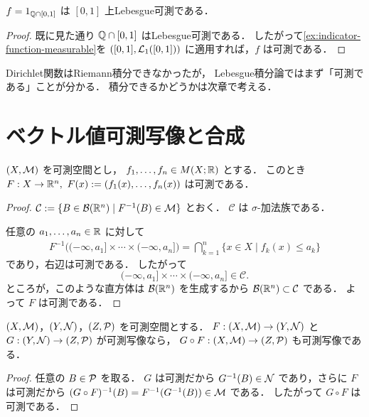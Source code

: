 \begin{example}[Dirichlet関数]
$f=1_{\mathbb Q\cap[0,1]}$
は $[0,1]$ 上Lebesgue可測である．
\end{example}
\begin{proof}
既に見た通り 
$\mathbb Q\cap[0,1]$ はLebesgue可測である．
したがって\cref{ex:indicator-function-measurable}を
$([0,1],\mathcal L_1([0,1]))$ に適用すれば，$f$ は可測である．
\end{proof}

\begin{remark}
Dirichlet関数はRiemann積分できなかったが，
Lebesgue積分論ではまず「可測である」ことが分かる．
積分できるかどうかは次章で考える．
\end{remark}

\section{ベクトル値可測写像と合成}

\begin{proposition}[有限個の可測関数をまとめた写像]\label{prop:measurable-vector-map}
$(X,\mathcal M)$ を可測空間とし，
$f_1,\dots,f_n\in M(X;\mathbb R)$ とする．
このとき $F:X\to\RR^n,\ F(x):=(f_1(x),\dots,f_n(x))$ は可測である．
\end{proposition}
\begin{proof}
$\mathcal C:=\{B\in\mathcal B(\mathbb R^n)\mid F^{-1}(B)\in \mathcal M\}$
とおく．
$\mathcal C$ は $\sigma$-加法族である．

任意の $a_1,\dots,a_n\in\mathbb R$ に対して
\begin{align*}
F^{-1}\bigl((-\infty,a_1]\times\cdots\times(-\infty,a_n]\bigr)
=
\bigcap_{k=1}^n \{x\in X\mid f_k(x)\le a_k\}
\end{align*}
であり，右辺は可測である．
したがって
\[
(-\infty,a_1]\times\cdots\times(-\infty,a_n]\in\mathcal C.
\]
ところが，このような直方体は $\mathcal B(\mathbb R^n)$ を生成するから
$\mathcal B(\mathbb R^n)\subset \mathcal C$
である．
よって $F$ は可測である．
\end{proof}

\begin{theorem}[可測写像の合成]\label{thm:measurable-map-composition}
$(X,\mathcal M)$，$(Y,\mathcal N)$，$(Z,\mathcal P)$ を可測空間とする．
$F:(X,\mathcal M)\to(Y,\mathcal N)$ と $G:(Y,\mathcal N)\to(Z,\mathcal P)$ が可測写像なら，
$G\circ F:(X,\mathcal M)\to(Z,\mathcal P)$ も可測写像である．
\end{theorem}
\begin{proof}
任意の $B\in\mathcal P$ を取る．
$G$ は可測だから $G^{-1}(B)\in\mathcal N$ であり，さらに $F$ は可測だから
$(G\circ F)^{-1}(B)=F^{-1}(G^{-1}(B))\in\mathcal M$
である．
したがって $G\circ F$ は可測である．
\end{proof}

